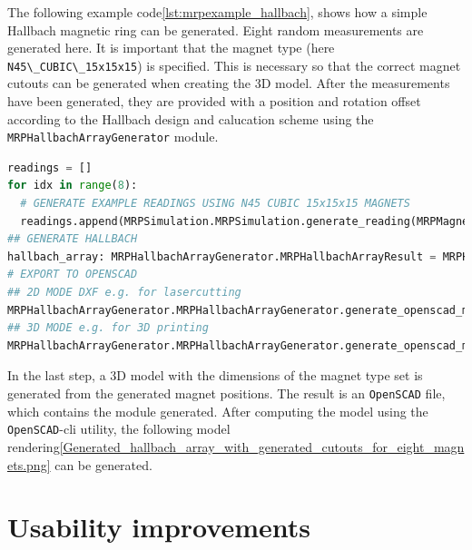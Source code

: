 The following example code\ref{lst:mrpexample_hallbach}, shows how a
simple Hallbach magnetic ring can be generated. Eight random
measurements are generated here. It is important that the magnet type
(here \passthrough{\lstinline!N45\_CUBIC\_15x15x15!}) is specified. This
is necessary so that the correct magnet cutouts can be generated when
creating the 3D model. After the measurements have been generated, they
are provided with a position and rotation offset according to the
Hallbach design and calucation
scheme\cite{HallbachMagnetDesignPaper} using the
\passthrough{\lstinline!MRPHallbachArrayGenerator!} module.

\begin{lstlisting}[language=Python, caption={MRPHallbachArrayGenerator example for generating an OpenSCAD based hallbach ring}, label=lst:mrpexample_hallbach]
readings = []
for idx in range(8):
  # GENERATE EXAMPLE READINGS USING N45 CUBIC 15x15x15 MAGNETS
  readings.append(MRPSimulation.MRPSimulation.generate_reading(MRPMagnetTypes.MagnetType.N45_CUBIC_15x15x15))
## GENERATE HALLBACH
hallbach_array: MRPHallbachArrayGenerator.MRPHallbachArrayResult = MRPHallbachArrayGenerator.MRPHallbachArrayGenerator.generate_1k_hallbach_using_polarisation_direction(readings)
# EXPORT TO OPENSCAD
## 2D MODE DXF e.g. for lasercutting
MRPHallbachArrayGenerator.MRPHallbachArrayGenerator.generate_openscad_model([hallbach_array], "./2d_test.scad",_2d_object_code=True)
## 3D MODE e.g. for 3D printing
MRPHallbachArrayGenerator.MRPHallbachArrayGenerator.generate_openscad_model([hallbach_array], "./3d_test.scad",_2d_object_code=False)
\end{lstlisting}

In the last step, a 3D model with the dimensions of the magnet type set
is generated from the generated magnet positions. The result is an
\passthrough{\lstinline!OpenSCAD!}\cite{OpenSCAD} file, which
contains the module generated. After computing the model using the
\passthrough{\lstinline!OpenSCAD!}-\gls{cli} utility, the following
model
rendering\ref{Generated_hallbach_array_with_generated_cutouts_for_eight_magnets.png}
can be generated.

\hypertarget{usability-improvements}{%
\chapter{Usability improvements}\label{usability-improvements}}

